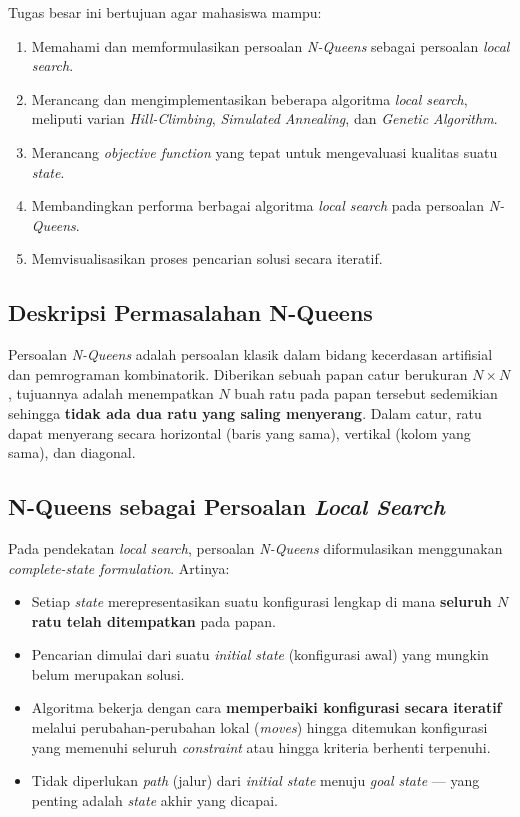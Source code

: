 \documentclass[12pt,a4paper]{article}
\begin{document}
Tugas besar ini bertujuan agar mahasiswa mampu:
\begin{enumerate}[label=\arabic*.]
    \item Memahami dan memformulasikan persoalan \textit{N-Queens} sebagai persoalan \textit{local search}.
    \item Merancang dan mengimplementasikan beberapa algoritma \textit{local search}, meliputi varian \textit{Hill-Climbing}, \textit{Simulated Annealing}, dan \textit{Genetic Algorithm}.
    \item Merancang \textit{objective function} yang tepat untuk mengevaluasi kualitas suatu \textit{state}.
    \item Membandingkan performa berbagai algoritma \textit{local search} pada persoalan \textit{N-Queens}.
    \item Memvisualisasikan proses pencarian solusi secara iteratif.
\end{enumerate}

\subsection{Deskripsi Permasalahan N-Queens}
\label{subsec:deskripsi}

Persoalan \textit{N-Queens} adalah persoalan klasik dalam bidang kecerdasan artifisial dan pemrograman kombinatorik. Diberikan sebuah papan catur berukuran $N \times N$, tujuannya adalah menempatkan $N$ buah ratu pada papan tersebut sedemikian sehingga \textbf{tidak ada dua ratu yang saling menyerang}. Dalam catur, ratu dapat menyerang secara horizontal (baris yang sama), vertikal (kolom yang sama), dan diagonal.

\subsection{N-Queens sebagai Persoalan \textit{Local Search}}
\label{subsec:local-search}

Pada pendekatan \textit{local search}, persoalan \textit{N-Queens} diformulasikan menggunakan \textit{complete-state formulation}. Artinya:
\begin{itemize}
    \item Setiap \textit{state} merepresentasikan suatu konfigurasi lengkap di mana \textbf{seluruh $N$ ratu telah ditempatkan} pada papan.
    \item Pencarian dimulai dari suatu \textit{initial state} (konfigurasi awal) yang mungkin belum merupakan solusi.
    \item Algoritma bekerja dengan cara \textbf{memperbaiki konfigurasi secara iteratif} melalui perubahan-perubahan lokal (\textit{moves}) hingga ditemukan konfigurasi yang memenuhi seluruh \textit{constraint} atau hingga kriteria berhenti terpenuhi.
    \item Tidak diperlukan \textit{path} (jalur) dari \textit{initial state} menuju \textit{goal state} --- yang penting adalah \textit{state} akhir yang dicapai.
\end{itemize}
\end{document}
